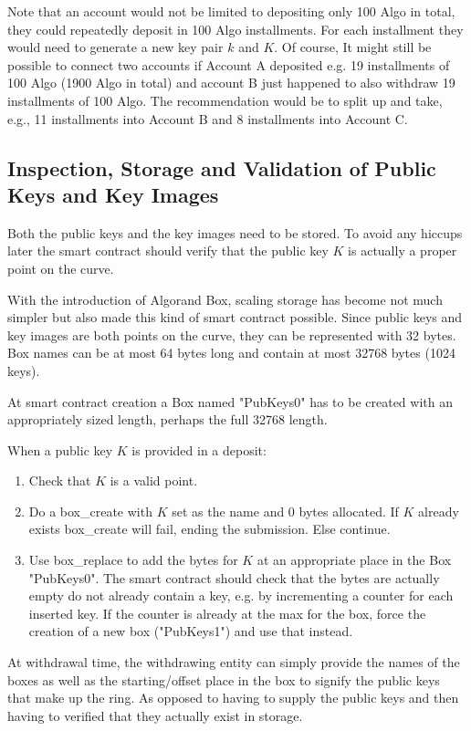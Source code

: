 \documentclass[9pt]{article}
\begin{document}
Note that an account would not be limited to depositing only 100 Algo in total, they could repeatedly deposit in 100 Algo installments. For each installment they would need to generate a new key pair $k$ and $K$. Of course, It might still be possible to connect two accounts if Account A deposited e.g. 19 installments of 100 Algo (1900 Algo in total) and account B just happened to also withdraw 19 installments of 100 Algo. The recommendation would be to split up and take, e.g., 11 installments into Account B and 8 installments into Account C. 

\subsection{Inspection, Storage and Validation of Public Keys and Key Images}

Both the public keys and the key images need to be stored. To avoid any hiccups later the smart contract should verify that the public key $K$ is actually a proper point on the curve.

With the introduction of Algorand Box, scaling storage has become not much simpler but also made this kind of smart contract possible. Since public keys and key images are both points on the curve, they can be represented with 32 bytes. Box names can be at most 64 bytes long and contain at most 32768 bytes (1024 keys).

At smart contract creation a Box named "PubKeys0" has to be created with an appropriately sized length, perhaps the full 32768 length.

When a public key $K$ is provided in a deposit:
\begin{enumerate}
    \item Check that $K$ is a valid point.
    \item Do a box\_create with $K$ set as the name and 0 bytes allocated. If $K$ already exists box\_create will fail, ending the submission. Else continue.
    \item Use box\_replace to add the bytes for $K$ at an appropriate place in the Box "PubKeys0". The smart contract should check that the bytes are actually empty do not already contain a key, e.g. by incrementing a counter for each inserted key. If the counter is already at the max for the box, force the creation of a new box ("PubKeys1") and use that instead.
\end{enumerate}

At withdrawal time, the withdrawing entity can simply provide the names of the boxes as well as the starting/offset place in the box to signify the public keys that make up the ring. As opposed to having to supply the public keys and then having to verified that they actually exist in storage.
\end{document}
